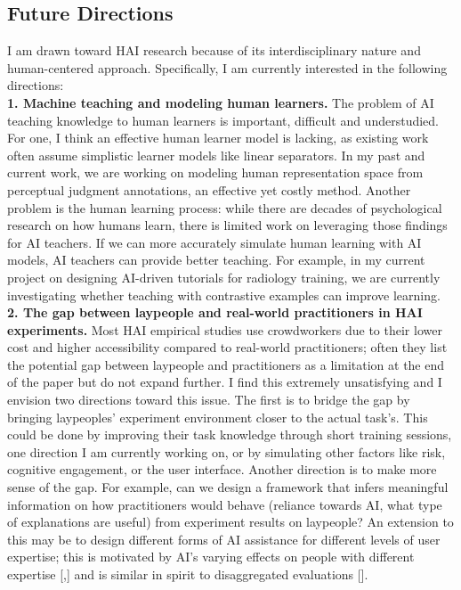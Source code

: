\subsection*{Future Directions}



I am drawn toward HAI research because of its interdisciplinary nature and human-centered approach. Specifically, I am currently interested in the following directions:
\noindent \textbf{\\1. Machine teaching and modeling human learners.} 
The problem of AI teaching knowledge to human learners is important, difficult and understudied. For one, I think an effective human learner model is lacking, as existing work often assume simplistic learner models like linear separators. In my past and current work, we are working on modeling human representation space from perceptual judgment annotations, an effective yet costly method. Another problem is the human learning process: while there are decades of psychological research on how humans learn, there is limited work on leveraging those findings for AI teachers. If we can more accurately simulate human learning with AI models, AI teachers can provide better teaching. For example, in my current project on designing AI-driven tutorials for radiology training, we are currently investigating whether teaching with contrastive examples can improve learning.
\noindent \textbf{\\2. The gap between laypeople and real-world practitioners in HAI experiments.}
Most HAI empirical studies use crowdworkers due to their lower cost and higher accessibility compared to real-world practitioners; often they list the potential gap between laypeople and practitioners as a limitation at the end of the paper but do not expand further. I find this extremely unsatisfying and I envision two directions toward this issue. The first is to bridge the gap by bringing laypeoples' experiment environment closer to the actual task's. This could be done by improving their task knowledge through short training sessions, one direction I am currently working on, or by simulating other factors like risk, cognitive engagement, or the user interface. Another direction is to make more sense of the gap. For example, can we design a framework that infers meaningful information on how practitioners would behave (reliance towards AI, what type of explanations are useful) from experiment results on laypeople? An extension to this may be to design different forms of AI assistance for different levels of user expertise; this is motivated by AI's varying effects on people with different expertise [,] and is similar in spirit to disaggregated evaluations [].
